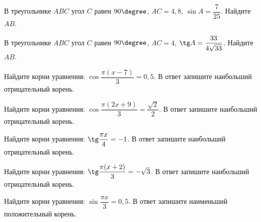 \begin{class}[number=1]
\begin{listofex}
		
		
		
		\item В треугольнике \(ABC\) угол \(C\) равен \(90\degree\), \(AC=4,8\), \( \sin A = \dfrac{ 7 }{ 25 } \). Найдите \(AB\).
		\item В треугольнике \(ABC\) угол \(C\) равен \(90\degree\), \(AC=4\), \( \tg A = \dfrac{ 33 }{ 4\sqrt{33} } \). Найдите \(AB\). 
		\item Найдите корни уравнения: \( \cos \dfrac{ \pi(x-7) }{ 3 } = 0,5 \).  В ответ запишите наибольший отрицательный корень.
		\item Найдите корни уравнения: \( \cos \dfrac{ \pi(2x+9) }{ 3 } = \dfrac{ \sqrt{2} }{ 2 } \).  В ответ запишите наибольший отрицательный корень.
		\item Найдите корни уравнения: \( \tg \dfrac{ \pi x }{ 4 } = -1 \).  В ответ запишите наибольший отрицательный корень.
		\item Найдите корни уравнения: \( \tg \dfrac{ \pi (x+2) }{ 3 } = -\sqrt{3} \).  В ответ запишите наибольший отрицательный корень.
		\item Найдите корни уравнения: \( \sin \dfrac{ \pi x }{ 3 } = 0,5 \).  В ответ запишите наименьший положительный корень.
		

\end{listofex}
\end{class}
